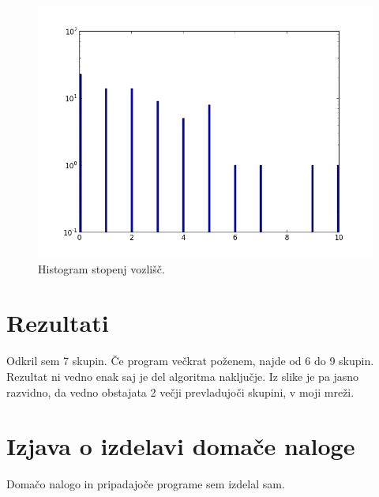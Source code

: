\documentclass[a4paper,11pt]{article}
\begin{document}
\begin{figure}[htbp]
\begin{center}
\includegraphics[scale=0.3]{histogram.png}
\caption{Histogram stopenj vozlišč.}
\label{slika1}
\end{center}
\end{figure}

\section{Rezultati}

Odkril sem 7 skupin. Če program večkrat poženem, najde od 6 do 9 skupin. Rezultat ni vedno enak saj je del algoritma naključje. Iz slike je pa  jasno razvidno, da vedno obstajata 2 večji  prevladujoči skupini, v moji mreži.

\section{Izjava o izdelavi domače naloge}
Domačo nalogo in pripadajoče programe sem izdelal sam.
\end{document}
